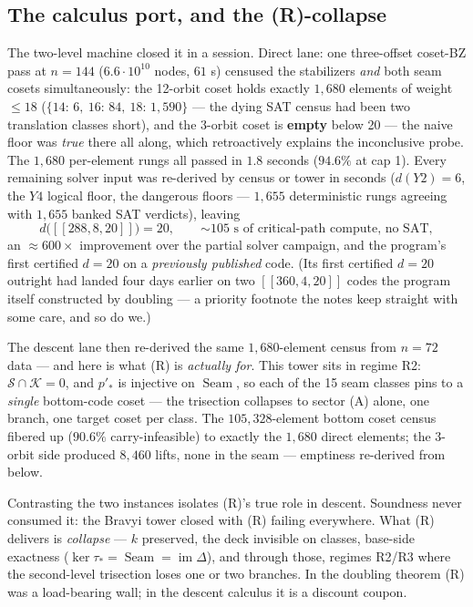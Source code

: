 \documentclass[11pt]{article}
\theoremstyle{plain}
\theoremstyle{definition}
\theoremstyle{remark}
\newcommand{\imD}{\operatorname{im}\Delta}
\newcommand{\Seam}{\operatorname{Seam}}
\begin{document}
\subsection{The calculus port, and the (R)-collapse}

The two-level machine closed it in a session. Direct lane: one
three-offset coset-BZ pass at $n = 144$ ($6.6\cdot 10^{10}$ nodes,
$61$ s) censused the stabilizers \emph{and} both seam cosets
simultaneously: the 12-orbit coset holds exactly $1{,}680$ elements of
weight $\leq 18$ ($\{14{:}\,6,\ 16{:}\,84,\ 18{:}\,1{,}590\}$ --- the
dying SAT census had been two translation classes short), and the
3-orbit coset is \textbf{empty} below 20 --- the naive floor was
\emph{true} there all along, which retroactively explains the
inconclusive probe. The $1{,}680$ per-element rungs all passed in
$1.8$ seconds ($94.6\%$ at cap 1). Every remaining solver input was
re-derived by census or tower in seconds ($d(Y2) = 6$, the $Y4$ logical
floor, the dangerous floors --- $1{,}655$ deterministic rungs agreeing
with $1{,}655$ banked SAT verdicts), leaving
\[
d\bigl([[288,8,20]]\bigr) = 20, \qquad
\text{${\sim}105$ s of critical-path compute, no SAT} ,
\]
an ${\approx}600\times$ improvement over the partial solver campaign,
and the program's first certified $d = 20$ on a \emph{previously
published} code. (Its first certified $d = 20$ outright had landed four
days earlier on two $[[360,4,20]]$ codes the program itself constructed
by doubling --- a priority footnote the notes keep straight with some
care, and so do we.)

The descent lane then re-derived the same $1{,}680$-element census from
$n = 72$ data --- and here is what (R) is \emph{actually for}. This
tower sits in regime R2: $\mathcal{S} \cap \mathcal{K} = 0$, and
$p'_*$ is injective on $\Seam$, so each of the 15 seam classes pins to
a \emph{single} bottom-code coset --- the trisection collapses to
sector (A) alone, one branch, one target coset per class. The
$105{,}328$-element bottom coset census fibered up ($90.6\%$
carry-infeasible) to exactly the $1{,}680$ direct elements; the 3-orbit
side produced $8{,}460$ lifts, none in the seam --- emptiness re-derived
from below.

\begin{keyidea}
Contrasting the two instances isolates (R)'s true role in descent.
Soundness never consumed it: the Bravyi tower closed with (R) failing
everywhere. What (R) delivers is \emph{collapse} --- $k$ preserved, the
deck invisible on classes, base-side exactness ($\ker\tau_* =
\Seam = \imD$), and through those, regimes R2/R3 where the second-level
trisection loses one or two branches. In the doubling theorem (R) was a
load-bearing wall; in the descent calculus it is a discount coupon.
\end{keyidea}
\end{document}
